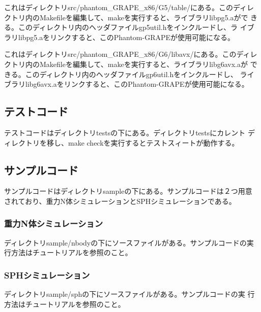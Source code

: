 
これはディレクトリsrc/phantom\_GRAPE\_x86/G5/table/にある。このディレ
クトリ内のMakefileを編集して、makeを実行すると、ライブラリlibpg5.aがで
きる。このディレクトリ内のヘッダファイルgp5util.hをインクルードし、ラ
イブラリlibpg5.aをリンクすると、このPhantom-GRAPEが使用可能になる。


これはディレクトリsrc/phantom\_GRAPE\_x86/G6/libavx/にある。このディレ
クトリ内のMakefileを編集して、makeを実行すると、ライブラリlibg6avx.aが
できる。このディレクトリ内のヘッダファイルgp6util.hをインクルードし、
ライブラリlibg6avx.aをリンクすると、このPhantom-GRAPEが使用可能になる。

\subsection{テストコード}

テストコードはディレクトリtestsの下にある。ディレクトリtestsにカレント
ディレクトリを移し、make checkを実行するとテストスィートが動作する。

\subsection{サンプルコード}

サンプルコードはディレクトリsampleの下にある。サンプルコードは２つ用意
されており、重力N体シミュレーションとSPHシミュレーションである。

\subsubsection{重力N体シミュレーション}

ディレクトリsample/nbodyの下にソースファイルがある。サンプルコードの実
行方法はチュートリアルを参照のこと。

\subsubsection{SPHシミュレーション}

ディレクトリsample/sphの下にソースファイルがある。サンプルコードの実
行方法はチュートリアルを参照のこと。
